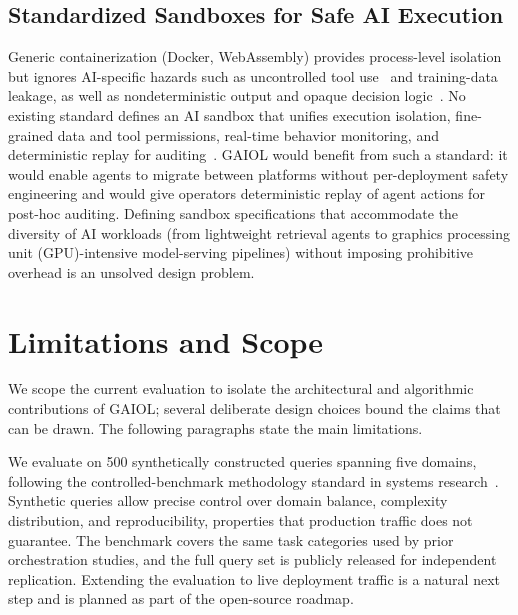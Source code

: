 \documentclass{iopjournal}
\begin{document}
\subsection{Standardized Sandboxes for Safe AI Execution}
Generic containerization (Docker, WebAssembly) provides process-level isolation but ignores AI-specific hazards such as uncontrolled tool use~\cite{Toolformer} and training-data leakage, as well as nondeterministic output and opaque decision logic~\cite{Weidinger}. No existing standard defines an AI sandbox that unifies execution isolation, fine-grained data and tool permissions, real-time behavior monitoring, and deterministic replay for auditing~\cite{bai2022constitutional}. GAIOL would benefit from such a standard: it would enable agents to migrate between platforms without per-deployment safety engineering and would give operators deterministic replay of agent actions for post-hoc auditing. Defining sandbox specifications that accommodate the diversity of AI workloads (from lightweight retrieval agents to graphics processing unit (GPU)-intensive model-serving pipelines) without imposing prohibitive overhead is an unsolved design problem.

\section{Limitations and Scope}
\label{sec:limitations}

We scope the current evaluation to isolate the architectural and algorithmic contributions of GAIOL; several deliberate design choices bound the claims that can be drawn. The following paragraphs state the main limitations.

We evaluate on 500 synthetically constructed queries spanning five domains, following the controlled-benchmark methodology standard in systems research~\cite{HolisticEval}. Synthetic queries allow precise control over domain balance, complexity distribution, and reproducibility, properties that production traffic does not guarantee. The benchmark covers the same task categories used by prior orchestration studies, and the full query set is publicly released for independent replication. Extending the evaluation to live deployment traffic is a natural next step and is planned as part of the open-source roadmap.
\end{document}
